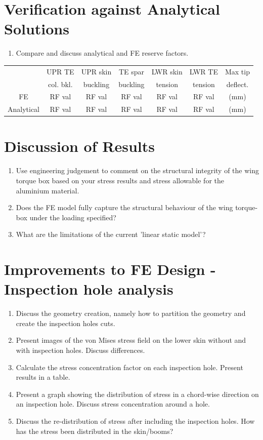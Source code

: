 \documentclass[11pt,a4paper,oneside]{memoir}
\begin{document}
\section{Verification against Analytical Solutions}
\begin{enumerate}
	\item Compare and discuss analytical and FE reserve factors.
\end{enumerate}

\begin{center}
	\begin{tabular}{ccccccc}
		\toprule
		            & UPR TE   & UPR skin & TE spar  & LWR skin & LWR TE  & Max tip  \\
		            & col. bkl.& buckling & buckling & tension  & tension & deflect. \\
		\midrule
		FE          &  RF val  &  RF val  &  RF val  &  RF val  & RF val  &  (mm)   \\
		\midrule
		Analytical  &  RF val  &  RF val  &  RF val  &  RF val  & RF val  &  (mm)   \\
		\bottomrule
	\end{tabular}
\end{center}

\section{Discussion of Results}
\begin{enumerate}
	\item Use engineering judgement to comment on the structural integrity of the wing torque box based on your stress results and stress allowable for the aluminium material. 
	\item Does the FE model fully capture the structural behaviour of the wing torque-box under the loading specified?
	\item What are the limitations of the current 'linear static model'?
\end{enumerate}	

\section{Improvements to FE Design - Inspection hole analysis}
\begin{enumerate}
	\item Discuss the geometry creation, namely how to partition the geometry and create the inspection holes cuts.
	\item Present images of the von Mises stress field on the lower skin without and with inspection holes. Discuss differences.
	\item Calculate the stress concentration factor on each inspection hole. Present results in a table.
	\item Present a graph showing the distribution of stress in a chord-wise direction on an inspection hole. Discuss stress concentration around a hole.
	\item Discuss the re-distribution of stress after including the inspection holes. How has the stress been distributed in the skin/booms?
\end{enumerate}
\end{document}
